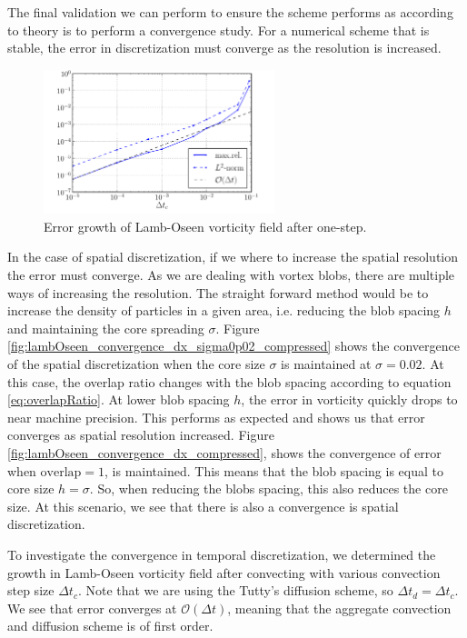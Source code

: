 The final validation we can perform to ensure the scheme performs as according to theory is to perform a convergence study. For a numerical scheme that is stable, the error in discretization must converge as the resolution is increased. 

	\begin{figure}[!b]
	\centering
	\includegraphics[width=0.6\textwidth]{figures/lagrangian/lambOseen_convergence_dt_compressed.pdf}
	\caption{Error growth of Lamb-Oseen vorticity field after one-step.}
	\label{fig:lambOseen_convergence_dt_compressed}
	\end{figure}

In the case of spatial discretization, if we where to increase the spatial resolution the error must converge. As we are dealing with vortex blobs, there are multiple ways of increasing the resolution. The straight forward method would be to increase the density of particles in a given area, i.e. reducing the blob spacing $h$ and maintaining the core spreading $\sigma$. Figure \ref{fig:lambOseen_convergence_dx_sigma0p02_compressed} shows the convergence of the spatial discretization when the core size $\sigma$ is maintained at $\sigma=0.02$. At this case, the overlap ratio changes with the blob spacing according to equation \ref{eq:overlapRatio}. At lower blob spacing $h$, the error in vorticity quickly drops to near machine precision. This performs as expected and shows us that error converges as spatial resolution increased. Figure \ref{fig:lambOseen_convergence_dx_compressed}, shows the convergence of error when $\mathrm{overlap} = 1$, is maintained. This means that the blob spacing is equal to core size $h=\sigma$. So, when reducing the blobs spacing, this also reduces the core size. At this scenario, we see that there is also a convergence is spatial discretization.
	
To investigate the convergence in temporal discretization, we determined the growth in Lamb-Oseen vorticity field after convecting with various convection step size $\Delta t_c$. Note that we are using the Tutty's diffusion scheme, so $\Delta t_d = \Delta t_c$. We see that error converges at $\mathcal{O}(\Delta t)$, meaning that the aggregate convection and diffusion scheme is of first order. 


